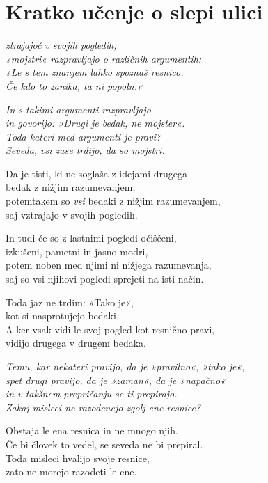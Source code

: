 \cleartorecto
{}
\chapter{Kratko učenje o slepi ulici}

\emph{ztrajajoč v svojih pogledih,\\
»mojstri« razpravljajo o različnih argumentih:\\
»Le s tem znanjem lahko spoznaš resnico.\\
Če kdo to zanika, ta ni popoln.«}

\emph{In s takimi argumenti razpravljajo}\\
\emph{in govorijo: »Drugi je bedak, ne mojster«.}\\
\emph{Toda kateri med argumenti je pravi?}\\
\emph{Seveda, vsi zase trdijo, da so mojstri.}

Da je tisti, ki ne soglaša z idejami drugega\\
bedak z nižjim razumevanjem,\\
potemtakem so \emph{vsi} bedaki z nižjim razumevanjem,\\
saj vztrajajo v svojih pogledih.

In tudi če so z lastnimi pogledi očiščeni,\\
izkušeni, pametni in jasno modri,\\
potem noben med njimi ni nižjega razumevanja,\\
saj so vsi njihovi pogledi sprejeti na isti način.


\clearpage

Toda jaz ne trdim: »Tako je«,\\
kot si nasprotujejo bedaki.\\
A ker vsak vidi le svoj pogled kot resnično pravi,\\
vidijo drugega v drugem bedaka.

\emph{Temu, kar nekateri pravijo, da je »pravilno«, »tako je«,\\
spet drugi pravijo, da je »zaman«, da je »napačno«\\
in v takšnem prepričanju se ti prepirajo.\\
Zakaj misleci ne razodenejo zgolj ene resnice?}

Obstaja le ena resnica in ne mnogo njih.\\
Če bi človek to vedel, se seveda ne bi prepiral.\\
Toda misleci hvalijo svoje resnice,\\
zato ne morejo razodeti le ene.

